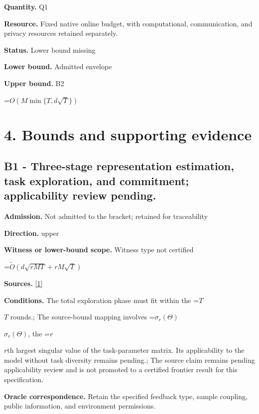 \documentclass[10pt,a4paper]{article}
\newcommand{\AtlasMath}[1]{\par\begingroup\centering\setbox0=\hbox{$\displaystyle #1$}\ifdim\wd0>1.4\linewidth\typeout{ATLAS WIDE FORMULA: \the\wd0}\fi\ifdim\wd0>\linewidth\resizebox{\linewidth}{!}{\box0}\else\box0\fi\par\endgroup}
\newcommand{\AtlasInlineMath}[1]{\begingroup\setbox0=\hbox{$#1$}\ifdim\wd0>.4\linewidth\endgroup\AtlasMath{#1}\else\endgroup$#1$\fi}
\begin{document}
\textbf{Quantity.} Q1



\textbf{Resource.} Fixed native online budget, with computational, communication, and privacy resources retained separately.



\textbf{Status.} Lower bound missing



\textbf{Lower bound.} Admitted envelope



\textbf{Upper bound.} B2



\AtlasMath{O(M\min\{T,d\sqrt T\})}


\section{4. Bounds and supporting evidence}


\subsection{B1 - Three-stage representation estimation, task exploration, and commitment; applicability review pending.}


\textbf{Admission.} Not admitted to the bracket; retained for traceability



\textbf{Direction.} upper



\textbf{Witness or lower-bound scope.} Witness type not certified



\AtlasMath{\widetilde{O}\!\left(d\sqrt{rMT}+rM\sqrt T\right)}


\textbf{Sources.} \href{https://arxiv.org/pdf/2203.15664}{[1]}



\textbf{Conditions.} The total exploration phase must fit within the \AtlasInlineMath{T} rounds.; The source-bound mapping involves \AtlasInlineMath{\sigma_r(\Theta)}, the \AtlasInlineMath{r}th largest singular value of the task-parameter matrix. Its applicability to the model without task diversity remains pending.; The source claim remains pending applicability review and is not promoted to a certified frontier result for this specification.



\textbf{Oracle correspondence.} Retain the specified feedback type, sample coupling, public information, and environment permissions.
\end{document}
